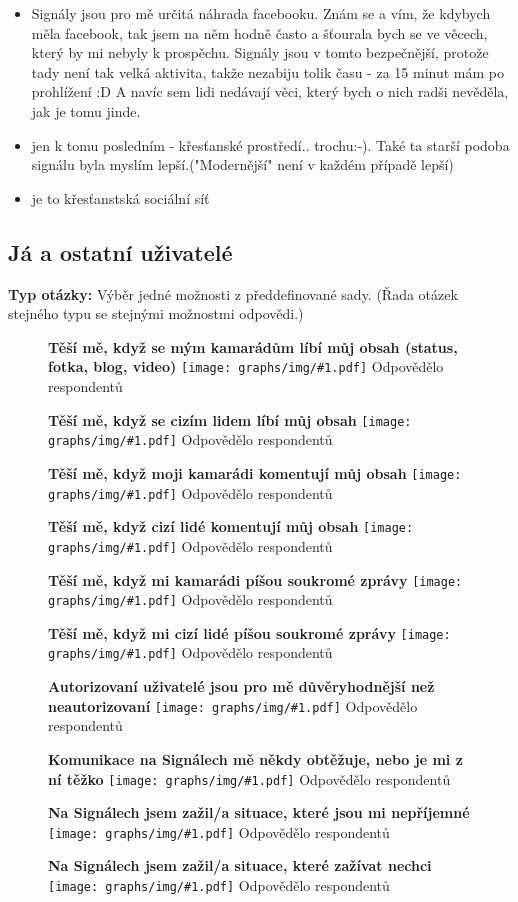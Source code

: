 \documentclass[12pt, a4paper, twoside]{article}
\newcommand{\answercount}[1]{Odpovědělo  respondentů}
\newcommand{\includegraph}[2]{
  \begin{figure}[H]
    \centering
    \textbf{#2}
    \texttt{[image: graphs/img/\#1.pdf]}
    \answercount{#1}
  \end{figure}
}
\newcommand{\qtype}{\textbf{Typ otázky:}
}
\newcommand{\pickOne}{Výběr jedné možnosti z předdefinované sady\xspace}
\newcommand{\series}{(Řada otázek stejného typu se stejnými možnostmi odpovědi.)\xspace}
\begin{document}
\begin{itemize}
\item Signály jsou pro mě určitá náhrada facebooku. Znám se a vím, že kdybych měla facebook, tak jsem na něm hodně často a šťourala bych se ve věcech, který by mi nebyly k prospěchu. Signály jsou v tomto bezpečnější, protože tady není tak velká aktivita, takže nezabiju tolik času - za 15 minut mám po prohlížení :D A navíc sem lidi nedávají věci, který bych o nich radši nevěděla, jak je tomu jinde.

\item jen k tomu posledním - křesťanské prostředí..  trochu:-). Také ta starší podoba signálu byla myslím lepší.("Modernější" není v každém případě lepší)

\item je to křesťanstská sociální síť
\end{itemize}

\subsection{Já a ostatní uživatelé}\label{sec:ostatniuzivatele}

\qtype \pickOne. \series

\includegraph{ostatni_tesi_me_libi_se_kamaradi}{Těší mě, když se mým kamarádům líbí můj obsah (status, fotka, blog, video)}

\includegraph{ostatni_tesi_me_libi_se_cizi}{Těší mě, když se cizím lidem líbí můj obsah}

\includegraph{ostatni_tesi_me_komentar_kamaradi}{Těší mě, když moji kamarádi komentují můj obsah}

\includegraph{ostatni_tesi_me_komentar_cizi}{Těší mě, když cizí lidé komentují můj obsah}

\includegraph{ostatni_tesi_me_zprava_kamaradi}{Těší mě, když mi kamarádi píšou soukromé zprávy}

\includegraph{ostatni_tesi_me_zprava_cizi}{Těší mě, když mi cizí lidé píšou soukromé zprávy}

\includegraph{ostatni_autorizovani_duveryhodnejsi}{Autorizovaní uživatelé jsou pro mě důvěryhodnější než neautorizovaní}

\includegraph{ostatni_neprijemne_komunikace_obtezuje}{Komunikace na Signálech mě někdy obtěžuje, nebo je mi z ní těžko}

\includegraph{ostatni_neprijemne_neprijemne_situace}{Na Signálech jsem zažil/a situace, které jsou mi nepříjemné}

\includegraph{ostatni_neprijemne_zazivat_nechci}{Na Signálech jsem zažil/a situace, které zažívat nechci}
\end{document}

